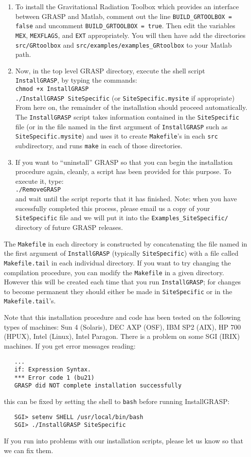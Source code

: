 \begin{enumerate}
\item
To install the Gravitational Radiation Toolbox which provides an interface between
GRASP and Matlab, comment out the line {\tt BUILD\_GRTOOLBOX = false} and
uncomment {\tt BUILD\_GRTOOLBOX = true}. Then edit the variables
{\tt MEX}, {\tt MEXFLAGS}, and {\tt EXT} appropriately. You will then have add the
directories {\tt src/GRtoolbox} and {\tt src/examples/examples\_GRtoolbox} to your Matlab path.
\item
Now, in the top level GRASP directory, execute the shell script {\tt
InstallGRASP}, by typing the commands:\\
{\tt chmod +x InstallGRASP\\
./InstallGRASP SiteSpecific} (or {\tt SiteSpecific.mysite} if appropriate)\\
From here on, the remainder of the installation should proceed
automatically.  The {\tt InstallGRASP} script takes information contained
in the {\tt SiteSpecific} file (or in the file named in the first
argument of {\tt InstallGRASP} such as {\tt SiteSpecific.mysite})
and uses it to create {\tt Makefile}'s
in each {\tt src} subdirectory, and runs {\tt make} in each of those
directories.
\item
If you want to ``uninstall'' GRASP so that you can begin the
installation procedure again, cleanly, a script has been provided
for this purpose.  To execute it, type:\\
{\tt ./RemoveGRASP}\\
and wait until the script reports that it has finished.
Note: when you have sucessfully completed this process, please email
us
a copy of your {\tt SiteSpecific} file and we will put it into the
{\tt Examples\_SiteSpecific/ } directory of future GRASP releases.
\end{enumerate}
The {\tt Makefile} in each directory is
constructed by concatenating the file named in the first argument
of {\tt InstallGRASP} (typically {\tt SiteSpecific}) with a file
called {\tt Makefile.tail} in each individual directory.  If you want to
try changing the compilation procedure, you can modify the {\tt Makefile}
in a given directory.  However this will be created each time that you
run {\tt InstallGRASP}; for changes to become permanent they should
either be made in {\tt SiteSpecific} or in the {\tt Makefile.tail}'s.

Note that this installation procedure and code has been tested on the
following types of machines:  Sun 4 (Solaris), DEC AXP (OSF), IBM SP2
(AIX), HP 700 (HPUX), Intel (Linux), Intel Paragon.  
There is a problem on some SGI (IRIX) machines.  If you get error messages
reading:
\begin{verbatim}
   ...
   if: Expression Syntax.
   *** Error code 1 (bu21)
   GRASP did NOT complete installation successfully
\end{verbatim}
this can be fixed by setting the shell to {\tt bash} before running
InstallGRASP:
\begin{verbatim}
   SGI> setenv SHELL /usr/local/bin/bash
   SGI> ./InstallGRASP SiteSpecific
\end{verbatim}
If you run into
problems with our installation scripts, please let us know so that we
can fix them.

